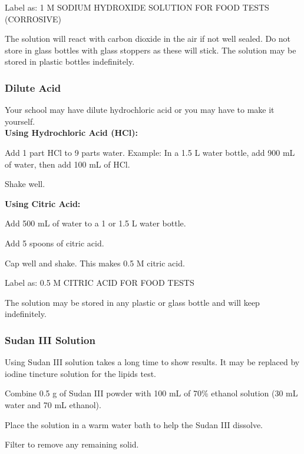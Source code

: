 \noindent Label as: 1 M SODIUM HYDROXIDE SOLUTION FOR FOOD TESTS (CORROSIVE)

\noindent The solution will react with carbon dioxide in the air if not well sealed. Do not store in glass bottles with glass stoppers as these will stick. The solution may be stored in plastic bottles indefinitely.


\subsubsection{Dilute Acid}  
Your school may have dilute hydrochloric acid or you may have to make it yourself.\\

\textbf{Using Hydrochloric Acid (HCl):}
\begin{itemize*}
\item Add 1 part HCl to 9 parts water. Example: In a 1.5 L water bottle, add 900 mL of water, then add 100 mL of HCl.
\item Shake well.
\end{itemize*}

\textbf{Using Citric Acid:}
\begin{itemize*}
\item Add 500 mL of water to a 1 or 1.5 L water bottle.
\item Add 5 spoons of citric acid.
\item Cap well and shake. This makes 0.5 M citric acid.
\end{itemize*}

\noindent Label as: 0.5 M CITRIC ACID FOR FOOD TESTS

\noindent The solution may be stored in any plastic or glass bottle and will keep indefinitely.

\subsubsection{Sudan III Solution} 
Using Sudan III solution takes a long time to show results. It may be replaced by iodine tincture solution for the lipids test.

\begin{itemize*}
\item Combine 0.5 g of Sudan III powder with 100 mL of 70\% ethanol solution (30 mL water and 70 mL ethanol).
\item Place the solution in a warm water bath to help the Sudan III dissolve.
\item Filter to remove any remaining solid.
\end{itemize*}

